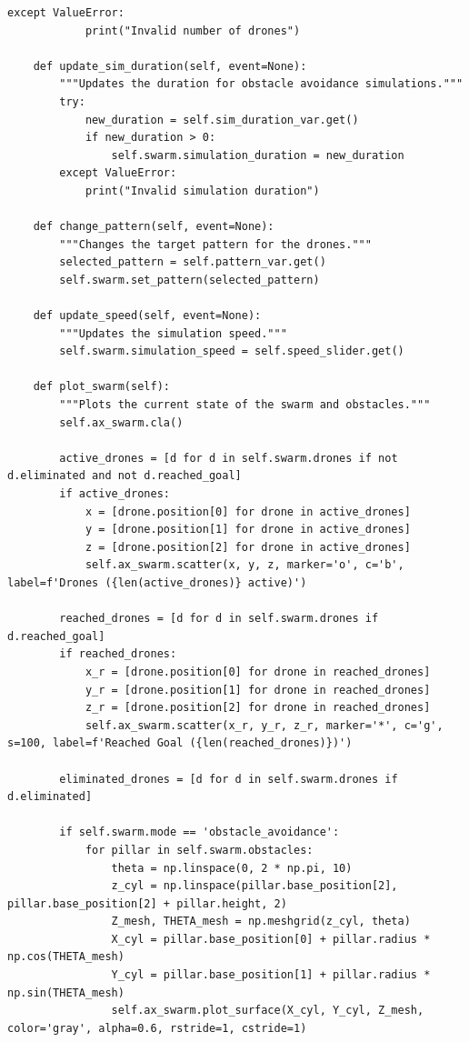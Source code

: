 \documentclass[11pt]{article}
\begin{document}
\begin{lstlisting}[style=pythonstyle]
        except ValueError:
            print("Invalid number of drones")

    def update_sim_duration(self, event=None):
        """Updates the duration for obstacle avoidance simulations."""
        try:
            new_duration = self.sim_duration_var.get()
            if new_duration > 0:
                self.swarm.simulation_duration = new_duration
        except ValueError:
            print("Invalid simulation duration")

    def change_pattern(self, event=None):
        """Changes the target pattern for the drones."""
        selected_pattern = self.pattern_var.get()
        self.swarm.set_pattern(selected_pattern)

    def update_speed(self, event=None):
        """Updates the simulation speed."""
        self.swarm.simulation_speed = self.speed_slider.get()

    def plot_swarm(self):
        """Plots the current state of the swarm and obstacles."""
        self.ax_swarm.cla()

        active_drones = [d for d in self.swarm.drones if not d.eliminated and not d.reached_goal]
        if active_drones:
            x = [drone.position[0] for drone in active_drones]
            y = [drone.position[1] for drone in active_drones]
            z = [drone.position[2] for drone in active_drones]
            self.ax_swarm.scatter(x, y, z, marker='o', c='b', label=f'Drones ({len(active_drones)} active)')

        reached_drones = [d for d in self.swarm.drones if d.reached_goal]
        if reached_drones:
            x_r = [drone.position[0] for drone in reached_drones]
            y_r = [drone.position[1] for drone in reached_drones]
            z_r = [drone.position[2] for drone in reached_drones]
            self.ax_swarm.scatter(x_r, y_r, z_r, marker='*', c='g', s=100, label=f'Reached Goal ({len(reached_drones)})')

        eliminated_drones = [d for d in self.swarm.drones if d.eliminated]

        if self.swarm.mode == 'obstacle_avoidance':
            for pillar in self.swarm.obstacles:
                theta = np.linspace(0, 2 * np.pi, 10)
                z_cyl = np.linspace(pillar.base_position[2], pillar.base_position[2] + pillar.height, 2)
                Z_mesh, THETA_mesh = np.meshgrid(z_cyl, theta)
                X_cyl = pillar.base_position[0] + pillar.radius * np.cos(THETA_mesh)
                Y_cyl = pillar.base_position[1] + pillar.radius * np.sin(THETA_mesh)
                self.ax_swarm.plot_surface(X_cyl, Y_cyl, Z_mesh, color='gray', alpha=0.6, rstride=1, cstride=1)


\end{lstlisting}
\end{document}

